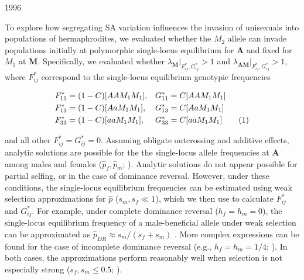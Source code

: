 1996\documentclass[9pt,twocolumn,twoside,lineno]{gsajnl}
\newcommand\numberthis{\addtocounter{equation}{1}\tag{\theequation}}
\begin{document}
To explore how segregating SA variation influences the invasion of unisexuals into populations of hermaphrodites, we evaluated whether the $M_2$ allele can invade populations initially at polymorphic single-locus equilibrium for $\mathbf{A}$ and fixed for $M_1$ at $\mathbf{M}$. Specifically, we evaluated whether $\lambda_\mathbf{M} \rvert_{F^{\ast}_{ij},G^{\ast}_{ij}} > 1$ and $\lambda_\mathbf{AM} \rvert_{F^{\ast}_{ij},G^{\ast}_{ij}} > 1$, where $F^{\ast}_{ij}$ correspond to the single-locus equilibrium genotypic frequencies
\begin{linenomath}\begin{align*} \label{eq:SA1locEQ}
	F^{\ast}_{11} &= (1 - C)[AAM_1M_1],& G^{\ast}_{11} &= C[AAM_1M_1]  \\
	F^{\ast}_{13} &= (1 - C)[AaM_1M_1],& G^{\ast}_{13} &= C[AaM_1M_1] \\
	F^{\ast}_{33} &= (1 - C)[aaM_1M_1],& G^{\ast}_{33} &= C[aaM_1M_1] \numberthis \\
\end{align*}\end{linenomath}

\noindent and all other $F^{\ast}_{ij} = G^{\ast}_{ij} =0$. Assuming obligate outcrossing and additive effects, analytic solutions are possible for the the single-locus allele frequencies at $\mathbf{A}$ among males and females ($\hat{p}_f,\hat{p}_m$; \citealt{Kidwell1977}). Analytic solutions do not appear possible for partial selfing, or in the case of dominance reversal. However, under these conditions, the single-locus equilibrium frequencies can be estimated using weak selection approximations for $\hat{p}$ ($s_m,s_f \ll 1$), which we then use to calculate $F^{\ast}_{ij}$ and $G^{\ast}_{ij}$. For example, under complete dominance reversal ($h_f=h_m=0$), the single-locus equilibrium frequency of a male-beneficial allele under weak selection can be approximated as $\hat{p}_{DR} \approx s_m/(s_f + s_m)$ \citep{ConnallonJordan2016}. More complex expressions can be found for the case of incomplete dominance reversal (e.g., $h_f=h_m=1/4$; \citealt{JordanConnallon2014,Olito2016}). In both cases, the approximations perform reasonably well when selection is not especially strong ($s_f,s_m \leq 0.5$; \citealt{JordanConnallon2014,ConnallonJordan2016,Olito2016}). 
\end{document}
